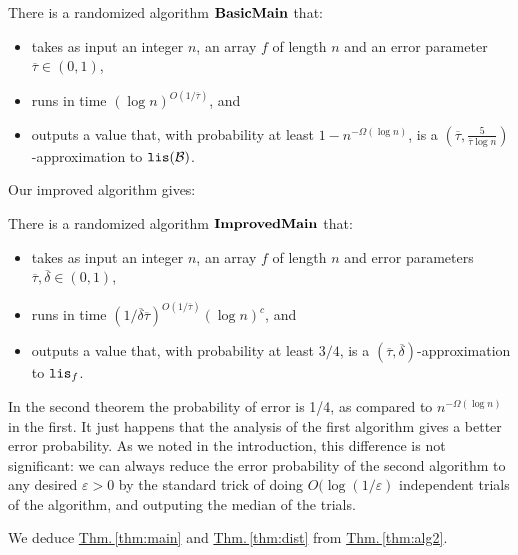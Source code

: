 \documentclass{acmsmall}
\newcommand{\cB}{{\cal B}}
\newcommand{\Thm}[1]{\hyperref[thm:#1]{Thm.\,\ref*{thm:#1}}} %
\newcommand{\lis}{{\tt lis}}
\newcommand{\deltapar}{\overline{\delta}}
\newcommand{\err}{\xi}
\newcommand{\taupar}{\overline{\tau}}
\newcommand{\eps}{\varepsilon}
\newcommand{\errorprob}{\eps}
\newcommand{\basicmain}{{\rm {\bf BasicMain}}}
\newcommand{\improvedmain}{{\rm {\bf ImprovedMain}}}
\begin{document}
\begin{theorem}
\label{thm:alg1}  
 There is a randomized algorithm $\basicmain$ that:
\begin{itemize}
\item  takes as input an integer $n$, an array $f$ of length $n$ and an error parameter $\taupar \in (0,1)$,
\item  runs in time $(\log n)^{O(1/\taupar)}$, and
\item outputs a value that, with probability at least $1-n^{-\Omega(\log n)}$, is a
{\em $(\taupar,\frac{5}{\taupar\log n})$}-approximation to $\lis(\cB)$. 
\end{itemize}
%
\end{theorem}

Our improved algorithm gives:

\begin{theorem}
\label{thm:alg2}   
 There is a randomized algorithm $\improvedmain$ that:
\begin{itemize}
\item  takes as input an integer $n$, an array $f$ of length $n$ and  error parameters $\taupar, \deltapar \in (0,1)$,
\item  runs in time $(1/\deltapar\taupar)^{O(1/\taupar)}(\log n)^c$, and 
\item outputs a value that, with probability at least $3/4$, is a
$(\taupar, \deltapar)$-approximation to $\lis_f$.
\end{itemize}
\end{theorem}


In the second theorem the probability of error is 1/4, as compared to $n^{-\Omega(\log n)}$ in the first.    It just happens that the analysis
of the first algorithm  gives a better error probability.  As we noted in the introduction, this difference
is not significant:
we can always reduce the error probability of the second algorithm to any desired $\errorprob>0$ by the standard trick of doing $O(\log(1/\errorprob)$
independent trials of the algorithm, and outputing the median of the trials.  

 
We deduce \Thm{main} and \Thm{dist} from  \Thm{alg2}.
\end{document}
